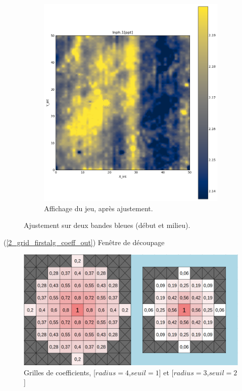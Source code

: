 \documentclass[12pt]{article}
\begin{document}
\begin{figure}[ht!]
\begin{subfigure}[b]{0.475\textwidth}
            \includegraphics[width=\textwidth]{Images/Base_man_grid_Apres_sq1.png}
            \caption[]%
            {{\small Affichage du jeu, après ajustement.}}
        \end{subfigure}
        \caption{Ajustement sur deux bandes bleues (début et milieu).}
    \end{figure}

\newpage
    \label{2_grid_firstalg_coeff_in} (\ref{2_grid_firstalg_coeff_out}) Fenêtre de découpage

    \begin{figure}[ht!]
        \centering
        \includegraphics[width=\textwidth]{Images/Grid_FirstAlg_Coeff.png}  
        \caption{Grilles de coefficients, [$radius=4$,$seuil=1$] et [$radius=3$,$seuil=2$]}
    \end{figure}
\end{document}

